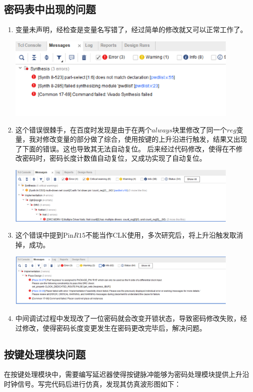 \documentclass[a4paper,11pt]{ctexart}
\begin{document}
\subsection{密码表中出现的问题}
\begin{enumerate}
  \item 变量未声明，经检查是变量名写错了，经过简单的修改就又可以正常工作了。

        \includegraphics[width=0.9\textwidth]{./images/error0.eps}
  \item 这个错误很棘手，在百度时发现是由于在两个$always$块里修改了同一个$reg$变量，我对修改变量的部分做了综合，使用按键的上升沿进行触发，结果又出现了下面的错误。这也导致其无法自动复位。
        后来经过代码修改，使得在不修改密码时，密码长度计数值自动复位，又成功实现了自动复位。

        \includegraphics[width=0.9\textwidth]{./images/error4.eps}
  \item 这个错误中提到Pin$R15$不能当作CLK使用，多次研究后，将上升沿触发取消掉，成功。

        \includegraphics[width=0.9\textwidth]{./images/error5.eps}

  \item 中间调试过程中发现改了一位密码就会改变开锁状态，导致密码修改失败，经过修改，使得密码长度变更发生在密码更改完毕后，解决问题。
\end{enumerate}

\subsection{按键处理模块问题}
在按键处理模块中，需要编写延迟器使得按键脉冲能够为密码处理模块提供上升沿时钟信号。写完代码后进行仿真，发现其仿真波形图如下：
\end{document}
